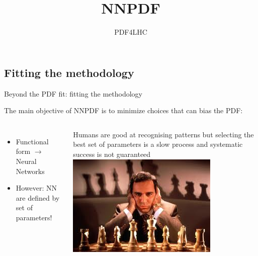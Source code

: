 \newcommand{\gct}{\color{darkgreen}\checkmark}
\newcommand{\rma}{\color{red}\ding{55}}
\newcommand{\bct}{\color{blue}\checkmark}
\title{NNPDF}
\author[Juan Cruz-Martinez]{}
\date{PDF4LHC}

\subsection{Fitting the methodology}

\begin{frame}{Beyond the PDF fit: fitting the methodology}

    The main objective of NNPDF is to minimize choices that can bias the PDF:

    \begin{columns}
        \begin{itemize}
            \item[\rma] Functional form $\longrightarrow$ Neural Networks
            \item[\rma] However: NN are defined by set of parameters!
        \end{itemize}

        \vspace{0.2cm}

        Humans are good at recognising patterns but selecting the best
        set of parameters is a slow process and systematic success is not guaranteed
        \includegraphics[width=\textwidth]{juan_future_hyperopt/kasparov.jpg}


\end{columns}
\end{frame}
